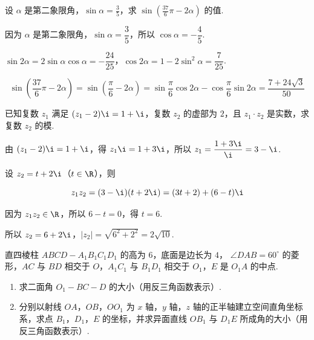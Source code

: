 \documentclass[UTF8,a4paper,oneside,11pt]{ctexbook}
\begin{document}
\begin{problem}
设 \(\alpha \) 是第二象限角，\(\sin\alpha=\frac{3}{5} \)，求 \(\sin\left(\frac{37}{6}\pi-2\alpha\right) \) 的值.
\end{problem}

\begin{solution}
因为 \(\alpha\) 是第二象限角，\(\sin\alpha=\dfrac{3}{5}\)，所以 \(\cos\alpha=-\dfrac{4}{5}\).

\(\sin2\alpha=2\sin\alpha\cos\alpha=-\dfrac{24}{25}\)，\(\cos2\alpha=1-2\sin^2\alpha=\dfrac{7}{25}\).

\[
\sin\left(\frac{37}{6}\pi-2\alpha\right)=\sin\left(\frac{\pi}{6}-2\alpha\right)=\sin\frac{\pi}{6}\cos2\alpha-\cos\frac{\pi}{6}\sin2\alpha=\frac{7+24\sqrt{3}}{50}
\]
\end{solution}

\begin{problem}
已知复数 \(z_{1} \) 满足 \((z_{1}-2)\i=1+\i \)，复数 \(z_{2} \) 的虚部为 \(2\)，且 \(z_{1}\cdot z_{2} \) 是实数，求复数 \(z_{2} \) 的模.
\end{problem}

\begin{solution}
由 \((z_1-2)\i=1+\i\)，得 \(z_1\i=1+3\i\)，所以 \(z_1=\dfrac{1+3\i}{\i}=3-\i\).

设 \(z_2=t+2\i\)（\(t\in\R\)），则

\[
z_1z_2=(3-\i)(t+2\i)=(3t+2)+(6-t)\i
\]

因为 \(z_1z_2\in\R\)，所以 \(6-t=0\)，得 \(t=6\).

所以 \(z_2=6+2\i\)，\(\lvert z_2\rvert=\sqrt{6^2+2^2}=2\sqrt{10}\).
\end{solution}

\begin{problem}
直四棱柱 \(ABCD - A_{1}B_{1}C_{1}D_{1} \) 的高为 \(6\)，底面是边长为 \(4\)， \(\angle DAB = 60^{\circ} \) 的菱形，\(AC\) 与 \(BD\) 相交于 \(O\)，\(A_{1}C_{1}\) 与 \(B_{1}D_{1}\) 相交于 \(O_{1}\)，\(E\) 是 \(O_{1}A\) 的中点.

\begin{enumerate}
\item 求二面角 \(O_{1}-BC-D \) 的大小（用反三角函数表示）.
\item 分别以射线 \(OA\)，\(OB\)，\(OO_{1}\) 为 \(x\) 轴，\(y\) 轴，\(z\) 轴的正半轴建立空间直角坐标系，求点 \(B_{1}\)，\(D_{1}\)，\(E\) 的坐标，并求异面直线 \(OB_{1}\) 与 \(D_{1}E\) 所成角的大小（用反三角函数表示）.
\end{enumerate}
\end{problem}
\end{document}
